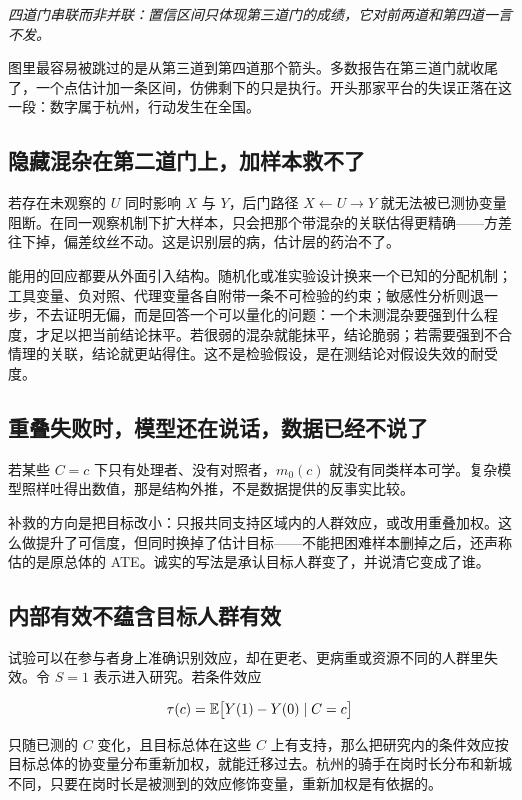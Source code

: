 \emph{四道门串联而非并联：置信区间只体现第三道门的成绩，它对前两道和第四道一言不发。}

图里最容易被跳过的是从第三道到第四道那个箭头。多数报告在第三道门就收尾了，一个点估计加一条区间，仿佛剩下的只是执行。开头那家平台的失误正落在这一段：数字属于杭州，行动发生在全国。

\subsection{隐藏混杂在第二道门上，加样本救不了}

若存在未观察的 \(U\) 同时影响 \(X\) 与 \(Y\)，后门路径 \(X\leftarrow U\rightarrow Y\) 就无法被已测协变量阻断。在同一观察机制下扩大样本，只会把那个带混杂的关联估得更精确——方差往下掉，偏差纹丝不动。这是识别层的病，估计层的药治不了。

能用的回应都要从外面引入结构。随机化或准实验设计换来一个已知的分配机制；工具变量、负对照、代理变量各自附带一条不可检验的约束；敏感性分析则退一步，不去证明无偏，而是回答一个可以量化的问题：一个未测混杂要强到什么程度，才足以把当前结论抹平。若很弱的混杂就能抹平，结论脆弱；若需要强到不合情理的关联，结论就更站得住。这不是检验假设，是在测结论对假设失效的耐受度。

\subsection{重叠失败时，模型还在说话，数据已经不说了}

若某些 \(C=c\) 下只有处理者、没有对照者，\(m_0(c)\) 就没有同类样本可学。复杂模型照样吐得出数值，那是结构外推，不是数据提供的反事实比较。

补救的方向是把目标改小：只报共同支持区域内的人群效应，或改用重叠加权。这么做提升了可信度，但同时换掉了估计目标——不能把困难样本删掉之后，还声称估的是原总体的 ATE。诚实的写法是承认目标人群变了，并说清它变成了谁。

\subsection{内部有效不蕴含目标人群有效}

试验可以在参与者身上准确识别效应，却在更老、更病重或资源不同的人群里失效。令 \(S=1\) 表示进入研究。若条件效应

\[
\tau(c)=\mathbb{E}\bigl[Y(1)-Y(0)\mid C=c\bigr]
\]

只随已测的 \(C\) 变化，且目标总体在这些 \(C\) 上有支持，那么把研究内的条件效应按目标总体的协变量分布重新加权，就能迁移过去。杭州的骑手在岗时长分布和新城不同，只要在岗时长是被测到的效应修饰变量，重新加权是有依据的。

